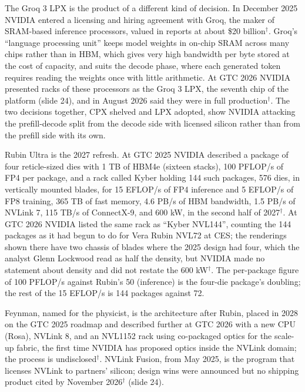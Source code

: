 \documentclass[11pt,letterpaper]{article}
\begin{document}
The Groq 3 LPX is the product of a different kind of decision. In December 2025 NVIDIA entered a licensing and hiring agreement with Groq, the maker of SRAM-based inference processors, valued in reports at about \$20 billion$^\dagger$. Groq's ``language processing unit'' keeps model weights in on-chip SRAM across many chips rather than in HBM, which gives very high bandwidth per byte stored at the cost of capacity, and suits the decode phase, where each generated token requires reading the weights once with little arithmetic. At GTC 2026 NVIDIA presented racks of these processors as the Groq 3 LPX, the seventh chip of the platform (slide 24), and in August 2026 said they were in full production$^\dagger$. The two decisions together, CPX shelved and LPX adopted, show NVIDIA attacking the prefill-decode split from the decode side with licensed silicon rather than from the prefill side with its own.

Rubin Ultra is the 2027 refresh. At GTC 2025 NVIDIA described a package of four reticle-sized dies with 1 TB of HBM4e (sixteen stacks), 100 PFLOP/s of FP4 per package, and a rack called Kyber holding 144 such packages, 576 dies, in vertically mounted blades, for 15 EFLOP/s of FP4 inference and 5 EFLOP/s of FP8 training, 365 TB of fast memory, 4.6 PB/s of HBM bandwidth, 1.5 PB/s of NVLink 7, 115 TB/s of ConnectX-9, and 600 kW, in the second half of 2027$^\dagger$. At GTC 2026 NVIDIA listed the same rack as ``Kyber NVL144'', counting the 144 packages as it had begun to do for Vera Rubin NVL72 at CES; the renderings shown there have two chassis of blades where the 2025 design had four, which the analyst Glenn Lockwood read as half the density, but NVIDIA made no statement about density and did not restate the 600 kW$^\dagger$. The per-package figure of 100 PFLOP/s against Rubin's 50 (inference) is the four-die package's doubling; the rest of the 15 EFLOP/s is 144 packages against 72.

Feynman, named for the physicist, is the architecture after Rubin, placed in 2028 on the GTC 2025 roadmap and described further at GTC 2026 with a new CPU (Rosa), NVLink 8, and an NVL1152 rack using co-packaged optics for the scale-up fabric, the first time NVIDIA has proposed optics inside the NVLink domain; the process is undisclosed$^\dagger$. NVLink Fusion, from May 2025, is the program that licenses NVLink to partners' silicon; design wins were announced but no shipping product cited by November 2026$^\dagger$ (slide 24).
\end{document}
